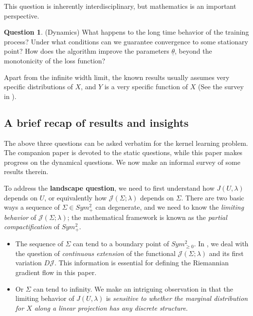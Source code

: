 \documentclass[a4paper]{article}
\theoremstyle{definition}
\newtheorem{Question}{Question}
\newcommand{\1}{\mathbbm{1}}
\begin{document}
	
	
	This question is inherently interdisciplinary, but mathematics is an important perspective.
	
	
	
	\begin{Question}
		(Dynamics)
		What happens to the long time behavior of the training process? Under what conditions can we guarantee convergence to some stationary point? How does the algorithm improve the parameters $\underline{\theta}$, beyond the monotonicity of the loss function?
	\end{Question}
	
	
	
	
	
	
	Apart from the infinite width limit, the known results usually assumes very specific distributions of $X$, and $Y$ is a very specific function of $X$ (See the survey in \cite[Appendix B]{MisiakiewiczMo23}).
	
	
	
	
	
	
	\subsection*{A brief recap of results and insights}	
	
	
	
	
	
	The above three questions can be asked verbatim for the kernel learning problem. The companion paper \cite{RuanLi} is devoted to the static questions, while this paper makes progress on the dynamical questions. We now make an informal survey of some results therein.
	
	
	To address the \textbf{landscape question}, we need to first understand how $J(U,\lambda)$ depends on $U$, or equivalently how $\mathcal{J}(\Sigma;\lambda)$ depends on $\Sigma$. There are two basic ways a sequence of $\Sigma\in Sym^2_+$ can degenerate, and we need to know the \emph{limiting behavior} of $\mathcal{J}(\Sigma;\lambda)$; the mathematical framework is known as the \emph{partial compactification} of $Sym^2_+$.
	\begin{itemize}
		\item The sequence of $\Sigma$ can tend to a boundary point of $Sym^2_{\geq 0}$. In \cite[Section 4]{RuanLi}, we deal with the question of \emph{continuous extension} of the functional $\mathcal{J}(\Sigma;\lambda)$ and its first variation $D\mathcal{J}$. This information is essential for defining the Riemannian gradient flow in this paper. 
		
		
		
		
		\item Or $\Sigma$ can tend to infinity. We make an intriguing observation in \cite[Section 3]{RuanLi} that the limiting behavior of $J(U,\lambda)$ is \emph{sensitive to whether the marginal distribution for $X$ along a linear projection has any discrete structure}.
	\end{itemize}
	
\end{document}
